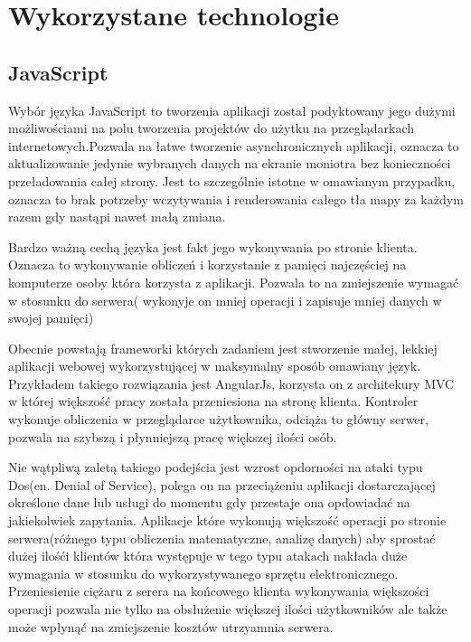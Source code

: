 \section{Wykorzystane technologie}
\label{sec:wykorzystanetechnologie}

\subsection{JavaScript}
\label{sec:javascript}

Wybór języka JavaScript to tworzenia aplikacji został podyktowany jego dużymi możliwościami na polu tworzenia projektów do użytku na przeglądarkach internetowych.Pozwala na łatwe tworzenie asynchronicznych aplikacji, oznacza to aktualizowanie jedynie wybranych danych na ekranie moniotra bez konieczności przeładowania całej strony. Jest to szczególnie istotne w omawianym przypadku, oznacza to brak potrzeby wczytywania i renderowania całego tła mapy za każdym razem gdy nastąpi nawet małą zmiana.

Bardzo ważną cechą języka jest fakt jego wykonywania po stronie klienta. Oznacza to wykonywanie obliczeń i korzystanie z pamięci najczęściej na komputerze osoby która korzysta z aplikacji. Pozwala to na zmiejszenie wymagać w stosunku do serwera( wykonyje on mniej operacji i zapisuje mniej danych w swojej pamięci)

Obecnie powstają frameworki których zadaniem jest stworzenie małej, lekkiej aplikacji webowej wykorzystującej w maksymalny sposób omawiany język.\cite{AngularJS} Przykładem takiego rozwiązania jest AngularJs, korzysta on z architekury MVC w której większość pracy została przeniesiona na stronę klienta. Kontroler wykonuje obliczenia w przeglądarce użytkownika, odciąża to główny serwer, pozwala na szybszą i płynniejszą pracę większej ilości osób.

Nie wątpliwą zaletą takiego podejścia jest wzrost opdorności na ataki typu Dos(en. Denial of Service), polega on na przeciążeniu aplikacji dostarczającej określone dane lub usługi do momentu gdy przestaje ona opdowiadać na jakiekolwiek zapytania. Aplikacje które wykonują większość operacji po stronie serwera(różnego typu obliczenia matematyczne, analizę danych) aby sprostać dużej ilośći klientów która występuje w tego typu atakach nakłada duże wymagania w stosunku do wykorzystywanego sprzętu elektronicznego. Przeniesienie ciężaru z serera na końcowego klienta wykonywania większości operacji pozwala nie tylko na obsłużenie większej ilości użytkowników ale także może wpłynąć na zmiejszenie kosztów utrzyamnia serwera.

